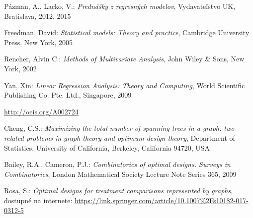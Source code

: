 \begin{thebibliography}{99}

	 Pázman, A., Lacko, V.: {\it Prednášky z regresných modelov}, Vydavateľstvo UK, Bratislava, 2012, 2015

	 Freedman, David: {\it Statistical models: Theory and practice}, Cambridge University Press, New York, 2005

	 Rencher, Alvin C.: {\it Methods of Multivariate Analysis}, John Wiley \& Sons, New York, 2002

	 Yan, Xin: {\it Linear Regression Analysis: Theory and Computing}, World Scientific Publishing Co. Pte. Ltd., Singapore, 2009

	 \url{http://oeis.org/A002724}

	 Cheng, C.S.: {\it Maximizing the total number of spanning trees in a graph: two related problems in graph theory and optimum design theory},
	Department of Statistics, University of California, Berkeley, California 94720, USA

	 Bailey, R.A., Cameron, P.J.: {\it Combinatorics of optimal designs. Surveys in Combinatorics}, London Mathematical Society Lecture Note Series 365, 2009

	 Rosa, S.: {\it Optimal designs for treatment comparisons represented by graphs}, dostupné na internete: \url{https://link.springer.com/article/10.1007%2Fs10182-017-0312-5}

\end{thebibliography}
